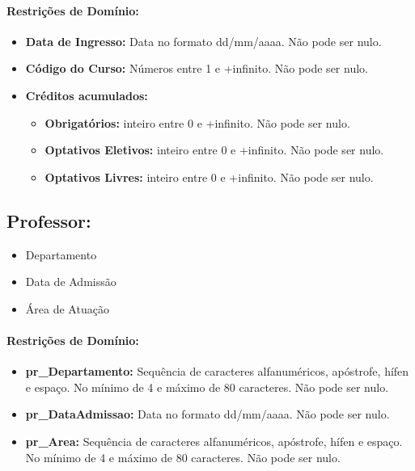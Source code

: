 \documentclass{report}
\begin{document}
\paragraph{Restrições de Domínio:}
\begin{itemize}
  \item \textbf{Data de Ingresso:} Data no formato dd/mm/aaaa. Não pode ser nulo.
  \item \textbf{Código do Curso:} Números entre 1 e +infinito. Não pode ser nulo.
  \item \textbf{Créditos acumulados:}
  \begin{itemize}
  	\item \textbf{Obrigatórios:} inteiro entre 0 e +infinito. Não pode ser nulo.
  	\item \textbf{Optativos Eletivos:} inteiro entre 0 e +infinito. Não pode ser nulo.
  	\item \textbf{Optativos Livres:} inteiro entre 0 e +infinito. Não pode ser nulo.
  \end{itemize}
\end{itemize}
\subsection{Professor:}
\begin{itemize}
  \item Departamento
  \item Data de Admissão
  \item Área de Atuação
\end{itemize}
\paragraph{Restrições de Domínio:}
\begin{itemize}
  \item \textbf{pr\_Departamento:} Sequência de caracteres alfanuméricos, apóstrofe, hífen e espaço. No mínimo de 4 e máximo de 80 caracteres. Não pode ser nulo.
  \item \textbf{pr\_DataAdmissao:} Data no formato dd/mm/aaaa. Não pode ser nulo.
  \item \textbf{pr\_Area:} Sequência de caracteres alfanuméricos, apóstrofe, hífen e espaço. No mínimo de 4 e máximo de 80 caracteres. Não pode ser nulo.
\end{itemize}
\end{document}
